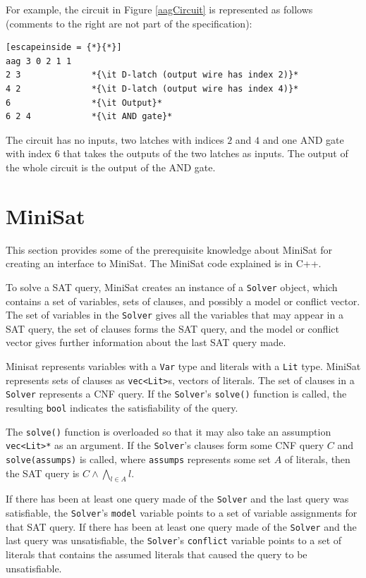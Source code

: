 \documentclass[12pt,a4paper,twoside,openright]{report}
\begin{document}
{{{For example, the circuit in Figure \ref{aagCircuit} is represented
as follows (comments to the right are not part of the specification):
\begin{lstlisting}[escapeinside = {*}{*}]
aag 3 0 2 1 1
2 3              *{\it D-latch (output wire has index 2)}*
4 2              *{\it D-latch (output wire has index 4)}*
6                *{\it Output}*
6 2 4            *{\it AND gate}*
\end{lstlisting}
The circuit has no inputs, two latches with indices $2$ and $4$ and one AND gate
with index $6$ that takes the outputs of the two latches as inputs.
The output of the whole circuit is the output of the AND gate.
}


\section{MiniSat}
\label{prep:minisat}

This section provides some of the prerequisite knowledge about MiniSat
for creating an interface to MiniSat. The MiniSat code
explained is in C++.

To solve a SAT query, MiniSat creates an instance of a \verb,Solver, object,
which contains a set of variables, sets of clauses, and possibly a model or conflict vector.
The set of variables in the \verb,Solver, gives all the variables that may appear in
a SAT query, the set of clauses forms the SAT query, and the model or conflict vector
gives further information about the last SAT query made.

Minisat represents variables with a \verb,Var, type and
literals with a \verb,Lit, type.
MiniSat represents sets of clauses as \verb,vec<Lit>,s,
vectors of literals. The set of clauses in a \verb,Solver, represents a CNF query.
If the \verb,Solver,'s \verb,solve(), function is called,
the resulting \verb,bool, indicates the satisfiability of the query.

The \verb,solve(), function is overloaded so that it may also take an assumption \verb,vec<Lit>*, as
an argument.
If the \verb,Solver,'s clauses form some CNF query $C$ and
\verb,solve(assumps), is called, where \verb,assumps, represents some set $A$ of literals,
then the SAT query is $C \wedge \bigwedge_{l \in A} l$.

If there has been at least one query made of the \verb,Solver, and the last query was
satisfiable, the \verb,Solver,'s \verb,model, variable points to a set of variable assignments
for that SAT query.
If there has been at least one query made of the \verb,Solver, and the last query was
unsatisfiable, the \verb,Solver,'s \verb,conflict, variable points to a set of literals that
contains the assumed literals that caused the query to be unsatisfiable.

}}
\end{document}
